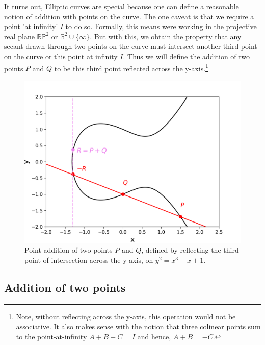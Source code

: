\documentclass[11pt, a4paper]{report}
\begin{document}
It turns out, Elliptic curves are special because one can define a reasonable notion of addition with points on the curve. The one caveat is that we require a point 'at infinity' $I$ to do so. Formally, this means were working in the projective real plane $\mathbb{RP}^2$ or $\mathbb{R}^2 \cup \lbrace \infty \rbrace$. 
But with this, we obtain the property that any secant drawn through two points on the curve must intersect another third point on the curve or this point at infinity $I$. Thus we will define the addition of two points $P$ and $Q$ to be this third point reflected across the y-axis.\footnote{Note, without reflecting across the y-axis, this operation would not be associative. It also makes sense with the notion that three colinear points sum to the point-at-infinity $A+B+C=I$ and hence, $A+B=-C$.}

\begin{figure}[ht]
\begin{center}
\includegraphics[width=\linewidth]{grouplaw.png} 
\caption{Point addition of two points $P$ and $Q$, defined by reflecting the third point of intersection across the y-axis, on $y^2 = x^3 -x+1$.}
\label{fig:additionEC}
\end{center}
\end{figure}

\subsection{Addition of two points}
\end{document}
